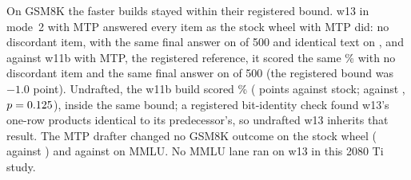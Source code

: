 \documentclass[11pt,letterpaper]{article}
\begin{document}
On GSM8K the faster builds stayed within their registered bound. w13 in
mode~2 with MTP answered every item as the stock wheel with MTP did: no discordant item, with the
same final answer on \PeQWSame{} of 500 and identical text on \PeQWIdent,
and against w11b with MTP, the registered reference, it scored the same
\PeQWModeTwoRefAcc\% with no discordant item and the same final answer on
\PeQWModeTwoRefSame{} of 500 (the registered bound was $-1.0$ point). Undrafted, the
w11b build scored
\PeQWElevenAcc\% (\PeQWElevenDiff{} points against stock; \PeQWElevenTen{}
against \PeQWElevenOtt, $p=0.125$), inside the same bound; a registered
bit-identity check found w13's one-row products identical to its predecessor's,
so undrafted w13 inherits that result. The MTP drafter changed no GSM8K
outcome on the stock wheel (\PeQMtpGsmTen{} against \PeQMtpGsmOtt) and
\PeQMtpMmluTen{} against \PeQMtpMmluOtt{} on MMLU. No MMLU lane ran on w13 in this 2080 Ti study.
\end{document}
